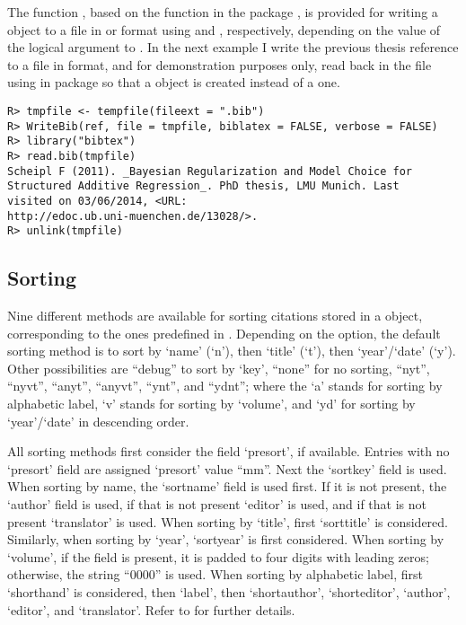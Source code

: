 \documentclass[article]{jss}\usepackage[]{graphicx}\usepackage[]{color}
\makeatletter
\newenvironment{kframe}{%
 \def\at@end@of@kframe{}%
 \ifinner\ifhmode%
  \def\at@end@of@kframe{\end{minipage}}%
  \begin{minipage}{\columnwidth}%
 \fi\fi%
 \def\FrameCommand##1{\hskip\@totalleftmargin \hskip-\fboxsep
 \colorbox{shadecolor}{##1}\hskip-\fboxsep
     \hskip-\linewidth \hskip-\@totalleftmargin \hskip\columnwidth}%
 \MakeFramed {\advance\hsize-\width
   \@totalleftmargin\z@ \linewidth\hsize
   \@setminipage}}%
 {\par\unskip\endMakeFramed%
 \at@end@of@kframe}
\newenvironment{knitrout}{}{} %
\makeatother
\begin{document}
The function , based on the function  in the package  \citep{Rbibtex}, is provided for writing a  object to a  file in \Biblatex{} or \Bibtex{} format using  and , respectively, depending on the value of the  logical argument to .  In the next example I write the previous thesis reference to a file in \Bibtex{} format, and for demonstration purposes only, read back in the  file using  in package  so that a  object is created instead of a  one.
\begin{knitrout}
\color{fgcolor}\begin{kframe}
\begin{verbatim}
R> tmpfile <- tempfile(fileext = ".bib")
R> WriteBib(ref, file = tmpfile, biblatex = FALSE, verbose = FALSE)
R> library("bibtex")
R> read.bib(tmpfile)
Scheipl F (2011). _Bayesian Regularization and Model Choice for
Structured Additive Regression_. PhD thesis, LMU Munich. Last
visited on 03/06/2014, <URL:
http://edoc.ub.uni-muenchen.de/13028/>.
R> unlink(tmpfile)
\end{verbatim}
\end{kframe}
\end{knitrout}

\subsection{Sorting}
Nine different methods are available for sorting citations stored in a  object, corresponding to the ones predefined in \Biblatex{}.  Depending on the  option, the default sorting method is  to sort by `name' (`n'), then `title' (`t'), then `year'/`date' (`y').  Other possibilities are ``debug'' to sort by `key', ``none'' for no sorting, ``nyt'', ``nyvt'', ``anyt'', ``anyvt'', ``ynt'', and ``ydnt''; where the `a' stands for sorting by alphabetic label, `v' stands for sorting by `volume', and `yd' for sorting by `year'/`date' in descending order.

All sorting methods first consider the field `presort', if available. Entries with no `presort' field are assigned `presort' value ``mm''. Next the `sortkey' field is used.  When sorting by name, the `sortname' field is used first. If it is not present, the `author' field is used, if that is not present `editor' is used, and if that is not present `translator' is used.  When sorting by `title', first `sorttitle' is considered. Similarly, when sorting by `year', `sortyear' is first considered.  When sorting by `volume', if the field is present, it is padded to four digits with leading zeros; otherwise, the string ``0000'' is used.  When sorting by alphabetic label, first `shorthand' is considered, then `label', then `shortauthor', `shorteditor', `author', `editor', and `translator'. Refer to \citet[Sections~3.1.2.1 and 3.5 and Appendix~C.2][]{biblatex} for further details.
\end{document}
